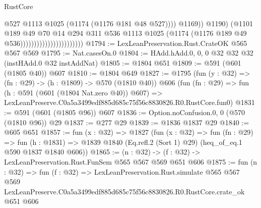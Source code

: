 \begin{lexlean}{RustCore}
\begin{coremodule}
                                                      @527
                                                      @1113
                                                      @1025
                                                      (@1174 (@1176 @181 @48 @527))))
                                                  @1169))
                                              @1190)
                                            (@1101
                                              @189
                                              @49
                                              @70
                                              @14
                                              @294
                                              @311
                                              @536
                                              @1113
                                              @1025
                                              (@1174 (@1176 @189 @49 @536)))))))))))))))))))))))
@1794 := LexLeanPreservation.Rust.CrateOK @565 @567 @569
@1795 := Nat.casesOn.{0}
@1804 := HAdd.hAdd.{0, 0, 0} @32 @32 @32 (instHAdd.{0} @32 instAddNat)
@1805 := @1804 @651
@1809 := @591 (@601 (@1805 @40)) @607
@1810 := @1804 @649
@1827 := @1795
    (fun (y : @32) => (fn : @29) -> (h : @1809) -> @570 (@1810 @40))
    @606
    (fun (fn : @29) =>
    fun (h : @591 (@601 (@1804 Nat.zero @40)) @607) =>
    LexLeanPreserve.C0a5a3499edf885d685c75f56c8830826.R0.RustCore.fun0)
@1831 := @591 (@601 (@1805 @96)) @607
@1836 := Option.noConfusion.{0, 0} (@570 (@1810 @96)) @29
@1837 := @277 @29
@1839 := @1836 @1837 @29
@1840 := @605 @651
@1857 := fun (x : @32) =>
  @1827
    (fun (x : @32) =>
    fun (fn : @29) =>
    fun (h : @1831) => @1839 @1840 (Eq.refl.{2} (Sort 1) @29) (heq_of_eq.{1} @590 @1837 @1840 @606))
@1865 := (n : @32) -> (f : @32) -> LexLeanPreservation.Rust.FunSem @565 @567 @569 @651 @606
@1875 := fun (n : @32) =>
  fun (f : @32) =>
  LexLeanPreservation.Rust.simulate
    @565
    @567
    @569
    LexLeanPreserve.C0a5a3499edf885d685c75f56c8830826.R0.RustCore.crate_ok
    @651
    @606
\end{coremodule}
\end{lexlean}
